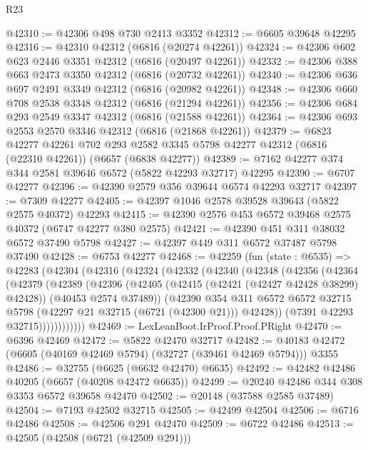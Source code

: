 \begin{lexlean}{R23}
\begin{coremodule}
@42310 := @42306 @498 @730 @2413 @3352
@42312 := @6605 @39648 @42295
@42316 := @42310 @42312 (@6816 (@20274 @42261))
@42324 := @42306 @602 @623 @2446 @3351 @42312 (@6816 (@20497 @42261))
@42332 := @42306 @388 @663 @2473 @3350 @42312 (@6816 (@20732 @42261))
@42340 := @42306 @636 @697 @2491 @3349 @42312 (@6816 (@20982 @42261))
@42348 := @42306 @660 @708 @2538 @3348 @42312 (@6816 (@21294 @42261))
@42356 := @42306 @684 @293 @2549 @3347 @42312 (@6816 (@21588 @42261))
@42364 := @42306 @693 @2553 @2570 @3346 @42312 (@6816 (@21868 @42261))
@42379 := @6823
    @42277
    @42261
    @702
    @293
    @2582
    @3345
    @5798
    @42277
    @42312
    (@6816 (@22310 @42261))
    (@6657 (@6838 @42277))
@42389 := @7162 @42277 @374 @344 @2581 @39646 @6572 (@5822 @42293 @32717) @42295
@42390 := @6707 @42277
@42396 := @42390 @2579 @356 @39644 @6574 @42293 @32717
@42397 := @7309 @42277
@42405 := @42397 @1046 @2578 @39528 @39643 (@5822 @2575 @40372) @42293
@42415 := @42390 @2576 @453 @6572 @39468 @2575 @40372 (@6747 @42277 @380 @2575)
@42421 := @42390 @451 @311 @38032 @6572 @37490 @5798
@42427 := @42397 @449 @311 @6572 @37487 @5798 @37490
@42428 := @6753 @42277
@42468 := @42259
    (fun (state : @6535) =>
    @42283
      (@42304
        (@42316
          (@42324
            (@42332
              (@42340
                (@42348
                  (@42356
                    (@42364
                      (@42379
                        (@42389
                          (@42396
                            (@42405
                              (@42415 (@42421 (@42427 @42428 @38299) @42428))
                              (@40453 @2574 @37489))
                            (@42390
                              @354
                              @311
                              @6572
                              @6572
                              @32715
                              @5798
                              (@42297 @21 @32715 (@6721 (@42300 @21)))
                              @42428))
                          (@7391 @42293 @32715))))))))))))
@42469 := LexLeanBoot.IrProof.Proof.PRight
@42470 := @6396 @42469
@42472 := @5822 @42470 @32717
@42482 := @40183 @42472 (@6605 (@40169 @42469 @5794) (@32727 (@39461 @42469 @5794))) @3355
@42486 := @32755 (@6625 (@6632 @42470) @6635)
@42492 := @42482 @42486 @40205 (@6657 (@40208 @42472 @6635))
@42499 := @20240 @42486 @344 @308 @3353 @6572 @39658 @42470
@42502 := @20148 (@37588 @2585 @37489)
@42504 := @7193 @42502 @32715
@42505 := @42499 @42504
@42506 := @6716 @42486
@42508 := @42506 @291 @42470
@42509 := @6722 @42486
@42513 := @42505 (@42508 (@6721 (@42509 @291)))

\end{coremodule}
\end{lexlean}
